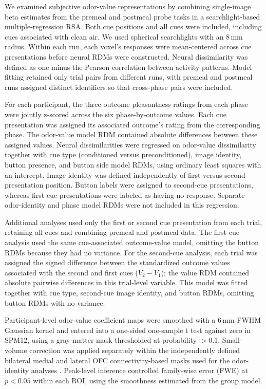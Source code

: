 \documentclass[9pt,twoside,lineno]{pnas-new}
\begin{document}
We examined subjective odor-value representations by combining single-image beta estimates from the premeal and postmeal probe tasks in a searchlight-based multiple-regression RSA. Both cue positions and all cues were included, including cues associated with clean air. We used spherical searchlights with an 8\,mm radius. Within each run, each voxel's responses were mean-centered across cue presentations before neural RDMs were constructed. Neural dissimilarity was defined as one minus the Pearson correlation between activity patterns. Model fitting retained only trial pairs from different runs, with premeal and postmeal runs assigned distinct identifiers so that cross-phase pairs were included.

For each participant, the three outcome pleasantness ratings from each phase were jointly z-scored across the six phase-by-outcome values. Each cue presentation was assigned its associated outcome's rating from the corresponding phase. The odor-value model RDM contained absolute differences between these assigned values. Neural dissimilarities were regressed on odor-value dissimilarity together with cue type (conditioned versus preconditioned), image identity, button presence, and button side model RDMs, using ordinary least squares with an intercept. Image identity was defined independently of first versus second presentation position. Button labels were assigned to second-cue presentations, whereas first-cue presentations were labeled as having no response. Separate odor-identity and phase model RDMs were not included in this regression.

Additional analyses used only the first or second cue presentation from each trial, retaining all cues and combining premeal and postmeal data. The first-cue analysis used the same cue-associated outcome-value model, omitting the button RDMs because they had no variance. For the second-cue analysis, each trial was assigned the signed difference between the standardized outcome values associated with the second and first cues ($V_2-V_1$); the value RDM contained absolute pairwise differences in this trial-level variable. This model was fitted together with cue type, second-cue image identity, and button RDMs, omitting button RDMs with no variance.

Participant-level odor-value coefficient maps were smoothed with a 6\,mm FWHM Gaussian kernel and entered into a one-sided one-sample t test against zero in SPM12, using a gray-matter mask thresholded at probability $>0.1$. Small-volume correction was applied separately within the independently defined bilateral medial and lateral OFC connectivity-based masks used for the odor-identity analyses \cite{kahnt2012connectivity}. Peak-level inference controlled family-wise error (FWE) at $p < 0.05$ within each ROI, using the smoothness estimated from the group model.
\end{document}
